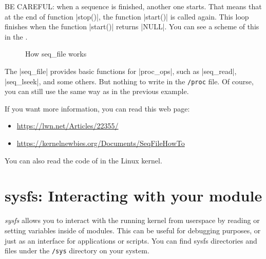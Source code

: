 \documentclass[10pt, oneside]{book}
\begin{document}
BE CAREFUL: when a sequence is finished, another one starts.
That means that at the end of function \cpp|stop()|, the function \cpp|start()| is called again.
This loop finishes when the function \cpp|start()| returns \cpp|NULL|.
You can see a scheme of this in the .

\begin{figure}[h]
  \center
  \caption{How seq\_file works}
  \label{img:seqfile}
\end{figure}

The \cpp|seq_file| provides basic functions for \cpp|proc_ops|, such as \cpp|seq_read|, \cpp|seq_lseek|, and some others.
But nothing to write in the \verb|/proc| file.
Of course, you can still use the same way as in the previous example.


If you want more information, you can read this web page:

\begin{itemize}
  \item \url{https://lwn.net/Articles/22355/}
  \item \url{https://kernelnewbies.org/Documents/SeqFileHowTo}
\end{itemize}

You can also read the code of  in the Linux kernel.

\section{sysfs: Interacting with your module}
\label{sec:sysfs}
\emph{sysfs} allows you to interact with the running kernel from userspace by reading or setting variables inside of modules.
This can be useful for debugging purposes, or just as an interface for applications or scripts.
You can find sysfs directories and files under the \verb|/sys| directory on your system.
\end{document}
